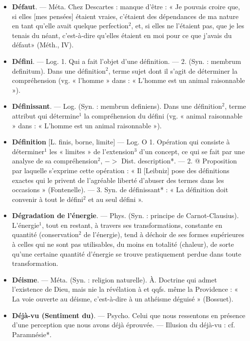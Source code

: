 \begin{itemize}[leftmargin=1cm, label=, itemsep=1pt]
\item {\bf Défaut}. — Méta. Chez Descartes :
manque d’être : « Je pouvais croire
que, si elles [mes pensées] étaient
vraies, c’étaient des dépendances
de ma nature en tant qu'elle avait
quelque perfection$^2$, et, si elles ne
l’étaient pas, que je les tenais du
néant, c'est-à-dire qu’elles étaient
en moi pour ce que j'avais du défaut»
(Méth., IV).

\item {\bf Défini}. — Log. 1. Qui a fait l'objet
d’une définition. — 2. (Syn. : membrum definitum). Dans une définition$^2$, terme sujet dont il s’agit de
déterminer la compréhension (vg.
« l'homme » dans : « L'homme est un
animal raisonnable »).

\item {\bf Définissant}. — Log. (Syn. : membrun
definiens). Dans une définition$^2$,
terme attribut qui détermine$^1$ la
compréhension du défini (vg. « animal raisonnable » dans : « L’homme
est un animal raisonnable »).

\item {\bf Définition} [L. finis, borne, limite]
— Log. O 1. Opération qui consiste à
déterminer$^1$ les « limites » de l’extension$^3$ d’un concept, ce qui se fait par
une analyse de sa compréhension$^2$,
$->$ Dist. description*. — 2. @ Proposition par laquelle s’exprime cette
opération : « Il [Leibniz] pose des
définitions exactes qui le privent de
l’agréable liberté d’abuser des termes
dans les occasions » (Fontenelle). —
3. Syn. de définissant* : « La définition doit convenir à tout le défini$^2$
et au seul défini ».

\item {\bf Dégradation de l'énergie}. — Phys.
(Syn. : principe de Carnot-Clausius).
L'énergie$^1$, tout en restant, à travers ses transformations, constante
en quantité (conservation$^2$ de l’énergie), tend à déchoir de ses formes
supérieures à celles qui ne sont pas
utilisables, du moins en totalité
(chaleur), de sorte qu’une certaine
quantité d'énergie se trouve pratiquement perdue dans toute transformation.

\item {\bf Déisme}. — Méta. (Syn. : religion naturelle). À. Doctrine qui admet l’existence de Dieu, mais nie la révélation
à et qqfs. même la Providence : « La
voie ouverte au déisme, c’est-à-dire
à un athéisme déguisé » (Bossuet).

\item {\bf Déjà-vu (Sentiment du)}. — Psycho.
Celui que nous ressentons en présence d’une perception que nous
avons déjà éprouvée. — Illusion du
déjà-vu : cf. Paramnésie*.


\end{itemize}
